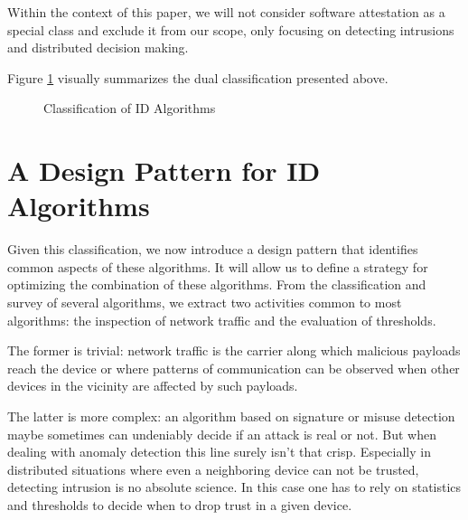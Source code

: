 \documentclass[conference]{IEEEtran}
\begin{document}
Within the context of this paper, we will not consider software attestation as
a special class and exclude it from our scope, only focusing on detecting
intrusions and distributed decision making.

Figure \ref{fig:classification} visually summarizes the dual classification
presented above.

\begin{figure}[!ht]
  \centering
  \caption{Classification of ID Algorithms}
  \label{fig:classification}
\end{figure}

\section{A Design Pattern for ID Algorithms}
\label{pattern}

Given this classification, we now introduce a design pattern that identifies
common aspects of these algorithms. It will allow us to define a strategy for
optimizing the combination of these algorithms. From the classification and
survey of several algorithms, we extract two activities common to most
algorithms: the inspection of network traffic and the evaluation of thresholds.

The former is trivial: network traffic is the carrier along which malicious
payloads reach the device or where patterns of communication can be observed
when other devices in the vicinity are affected by such payloads.

The latter is more complex: an algorithm based on signature or misuse detection
maybe sometimes can undeniably decide if an attack is real or not. But when
dealing with anomaly detection this line surely isn't that crisp. Especially in
distributed situations where even a neighboring device can not be trusted,
detecting intrusion is no absolute science. In this case one has to rely on
statistics and thresholds to decide when to drop trust in a given device.
\end{document}
